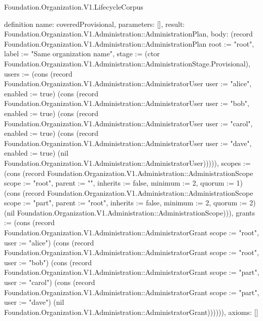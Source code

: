 \begin{lexlean}{Foundation.Organization.V1.LifecycleCorpus}
\begin{semanticmodule}
definition{
  name: coveredProvisional,
  parameters: [],
  result: Foundation.Organization.V1.Administration::AdministrationPlan,
  body: (record Foundation.Organization.V1.Administration::AdministrationPlan {root := "root", label := "Same organization name", stage := (ctor Foundation.Organization.V1.Administration::AdministrationStage.Provisional), users := (cons (record Foundation.Organization.V1.Administration::AdministratorUser {user := "alice", enabled := true}) (cons (record Foundation.Organization.V1.Administration::AdministratorUser {user := "bob", enabled := true}) (cons (record Foundation.Organization.V1.Administration::AdministratorUser {user := "carol", enabled := true}) (cons (record Foundation.Organization.V1.Administration::AdministratorUser {user := "dave", enabled := true}) (nil Foundation.Organization.V1.Administration::AdministratorUser))))), scopes := (cons (record Foundation.Organization.V1.Administration::AdministrationScope {scope := "root", parent := "", inherits := false, minimum := 2, quorum := 1}) (cons (record Foundation.Organization.V1.Administration::AdministrationScope {scope := "part", parent := "root", inherits := false, minimum := 2, quorum := 2}) (nil Foundation.Organization.V1.Administration::AdministrationScope))), grants := (cons (record Foundation.Organization.V1.Administration::AdministratorGrant {scope := "root", user := "alice"}) (cons (record Foundation.Organization.V1.Administration::AdministratorGrant {scope := "root", user := "bob"}) (cons (record Foundation.Organization.V1.Administration::AdministratorGrant {scope := "part", user := "carol"}) (cons (record Foundation.Organization.V1.Administration::AdministratorGrant {scope := "part", user := "dave"}) (nil Foundation.Organization.V1.Administration::AdministratorGrant)))))}),
  axioms: []
}


\end{semanticmodule}
\end{lexlean}
